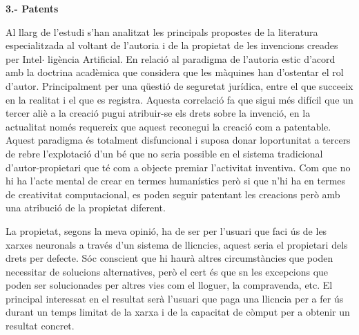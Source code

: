 \documentclass[12pt]{article}
\renewcommand{\_}{\kern-1.5pt\textunderscore\kern-1.5pt}
\begin{document}
\begin{itemize}
\vspace{\baselineskip}
\textbf{3.- Patents}\par


\vspace{\baselineskip}
\begin{justify}
Al llarg de l’estudi s’han analitzat les principals propostes de la literatura especialitzada al voltant de l’autoria i de la propietat de les invencions creades per Intel$ \cdot $ ligència Artificial. En relació al paradigma de l’autoria estic d’acord amb la doctrina acadèmica que considera que les màquines han d’ostentar el rol d’autor. Principalment per una qüestió de seguretat jurídica, entre el que succeeix en la realitat i el que es registra. Aquesta correlació fa que sigui més difícil que un tercer aliè a la creació pugui atribuir-se els drets sobre la invenció, en la actualitat només requereix que aquest reconegui la creació com a patentable. Aquest paradigma és totalment disfuncional i suposa donar loportunitat a tercers de rebre l’explotació d’un bé que no seria possible en el sistema tradicional d’autor-propietari que té com a objecte premiar l’activitat inventiva. Com que no hi ha l’acte mental de crear en termes humanístics però si que n’hi ha en termes de creativitat computacional, es poden seguir patentant les creacions però amb una atribució de la propietat diferent.
\end{justify}\par

\begin{justify}
La propietat, segons la meva opinió,  ha de ser per l’usuari que faci ús de les xarxes neuronals a través d’un sistema de llicncies, aquest seria el propietari dels drets per defecte. Sóc conscient que hi haurà altres circumstàncies que poden necessitar de solucions alternatives, però el cert és que sn les excepcions que poden ser solucionades per altres vies com el lloguer, la compravenda, etc. El principal interessat en el resultat serà l’usuari que paga una llicncia per a fer ús durant un temps limitat de la xarxa i de la capacitat de còmput per a obtenir un resultat concret.
\end{justify}\par



\end{itemize}
\end{document}
